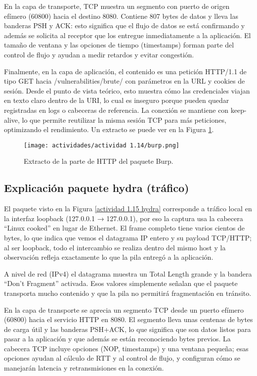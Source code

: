 \documentclass[letter,12pt]{article}
\begin{document}
En la capa de transporte, TCP muestra un segmento con puerto de origen efímero (60800) hacia el destino 8080. Contiene 807 bytes de datos y lleva las banderas PSH y ACK: esto significa que el flujo de datos se está confirmando y además se solicita al receptor que los entregue inmediatamente a la aplicación. El tamaño de ventana y las opciones de tiempo (timestamps) forman parte del control de flujo y ayudan a medir retardos y evitar congestión.

Finalmente, en la capa de aplicación, el contenido es una petición HTTP/1.1 de tipo GET hacia /vulnerabilities/brute/ con parámetros en la URL y cookies de sesión. Desde el punto de vista teórico, esto muestra cómo las credenciales viajan en texto claro dentro de la URI, lo cual es inseguro porque pueden quedar registradas en logs o cabeceras de referencia. La conexión se mantiene con keep-alive, lo que permite reutilizar la misma sesión TCP para más peticiones, optimizando el rendimiento. Un extracto se puede ver en la Figura \ref{actividad 1.14 burl}.

\begin{figure}[H]
    \centering
    \texttt{[image: actividades/actividad 1.14/burp.png]}
    \caption{Extracto de la parte de HTTP del paquete Burp.}
    \label{actividad 1.14 burl}
\end{figure}

\subsection{Explicación paquete hydra (tráfico)}
El paquete visto en la Figura \ref{actividad 1.15 hydra} corresponde a tráfico local en la interfaz loopback (127.0.0.1 → 127.0.0.1), por eso la captura usa la cabecera “Linux cooked” en lugar de Ethernet. El frame completo tiene varios cientos de bytes, lo que indica que vemos el datagrama IP entero y su payload TCP/HTTP; al ser loopback, todo el intercambio se realiza dentro del mismo host y la observación refleja exactamente lo que la pila entregó a la aplicación.

A nivel de red (IPv4) el datagrama muestra un Total Length grande y la bandera “Don’t Fragment” activada. Esos valores simplemente señalan que el paquete transporta mucho contenido y que la pila no permitirá fragmentación en tránsito.

En la capa de transporte se aprecia un segmento TCP desde un puerto efímero (60800) hacia el servicio HTTP en 8080. El segmento lleva unas centenas de bytes de carga útil y las banderas PSH+ACK, lo que significa que son datos listos para pasar a la aplicación y que además se están reconociendo bytes previos. La cabecera TCP incluye opciones (NOP, timestamps) y una ventana pequeña; esas opciones ayudan al cálculo de RTT y al control de flujo, y configuran cómo se manejarán latencia y retransmisiones en la conexión.
\end{document}
